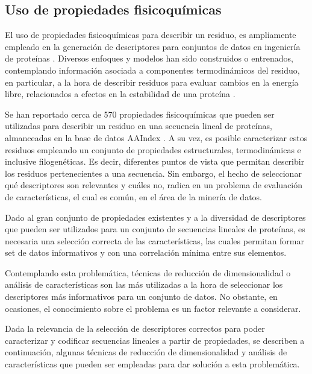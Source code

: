 \subsection{Uso de propiedades fisicoquímicas}

El uso de propiedades fisicoquímicas para describir un residuo, es ampliamente empleado en la generación de descriptores para conjuntos de datos en ingeniería de proteínas \cite{capriotti2005mutant2, capriotti2008three}. Diversos enfoques y modelos han sido construidos o entrenados, contemplando información asociada a componentes termodinámicos del residuo, en particular, a la hora de describir residuos para evaluar cambios en la energía libre, relacionados a efectos en la estabilidad de una proteína \cite{ancien2018prediction, broom2017computational, 1gzp030}.

Se han reportado cerca de 570 propiedades fisicoquímicas que pueden ser utilizadas para describir un residuo en una secuencia lineal de proteínas, almanceadas en la base de datos AAIndex \cite{Kawashima2000}. A su vez, es posible caracterizar estos residuos empleando un conjunto de propiedades estructurales, termodinámicas e inclusive filogenéticas. Es decir, diferentes puntos de vista que permitan describir los residuos pertenecientes a una secuencia. Sin embargo, el hecho de seleccionar qué descriptores son relevantes y cuáles no, radica en un problema de evaluación de características, el cual es común, en el área de la minería de datos. 

Dado al gran conjunto de propiedades existentes y a la diversidad de descriptores que pueden ser utilizados para un conjunto de secuencias lineales de proteínas, es necesaria una selección correcta de las características, las cuales permitan formar set de datos informativos y con una correlación mínima entre sus elementos. 

Contemplando esta problemática, técnicas de reducción de dimensionalidad o análisis de características son las más utilizadas a la hora de seleccionar los descriptores más informativos para un conjunto de datos. No obstante, en ocasiones, el conocimiento sobre el problema es un factor relevante a considerar. 

Dada la relevancia de la selección de descriptores correctos para poder caracterizar y codificar secuencias lineales a partir de propiedades, se describen a continuación, algunas técnicas de reducción de dimensionalidad y análisis de características que pueden ser empleadas para dar solución a esta problemática.

